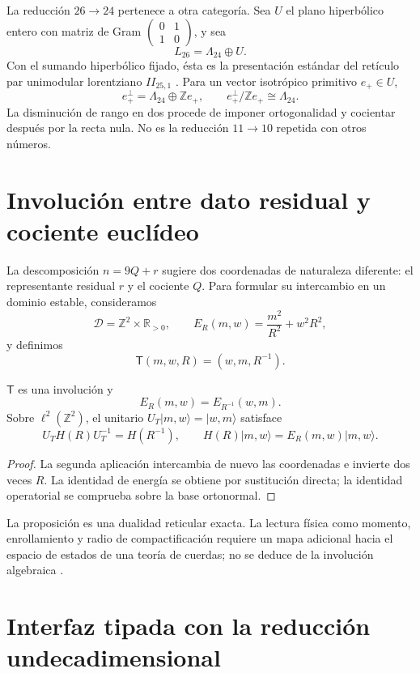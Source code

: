 La reducción \(26\to24\) pertenece a otra categoría. Sea \(U\) el plano
hiperbólico entero con matriz de Gram
\(\left(\begin{smallmatrix}0&1\\1&0\end{smallmatrix}\right)\), y sea
\[
 L_{26}=\Lambda_{24}\oplus U.
\]
Con el sumando hiperbólico fijado, ésta es la presentación estándar del
retículo par unimodular lorentziano \(II_{25,1}\)
\cite{ConwaySloane1999}.
Para un vector isotrópico primitivo \(e_+\in U\),
\[
 e_+^\perp=\Lambda_{24}\oplus\mathbb Ze_+,
\qquad
 e_+^\perp/\mathbb Ze_+\cong\Lambda_{24}.
\]
La disminución de rango en dos procede de imponer ortogonalidad y cocientar
después por la recta nula. No es la reducción \(11\to10\) repetida con otros
números.

\section{Involución entre dato residual y cociente euclídeo}

La descomposición \(n=9Q+r\) sugiere dos coordenadas de naturaleza diferente:
el representante residual \(r\) y el cociente \(Q\). Para formular su
intercambio en un dominio estable, consideramos
\[
 \mathcal D=\mathbb Z^2\times\mathbb R_{>0},
\qquad
 E_R(m,w)=\frac{m^2}{R^2}+w^2R^2,
\]
y definimos
\[
 \mathsf T(m,w,R)=(w,m,R^{-1}).
\]
\begin{proposition}
\(\mathsf T\) es una involución y
\[
 E_R(m,w)=E_{R^{-1}}(w,m).
\]
Sobre \(\ell^2(\mathbb Z^2)\), el unitario
\(U_T|m,w\rangle=|w,m\rangle\) satisface
\[
 U_TH(R)U_T^{-1}=H(R^{-1}),
\qquad
 H(R)|m,w\rangle=E_R(m,w)|m,w\rangle.
\]
\end{proposition}
\begin{proof}
La segunda aplicación intercambia de nuevo las coordenadas e invierte dos
veces \(R\). La identidad de energía se obtiene por sustitución directa; la
identidad operatorial se comprueba sobre la base ortonormal.
\end{proof}

La proposición es una dualidad reticular exacta. La lectura física como
momento, enrollamiento y radio de compactificación requiere un mapa adicional
hacia el espacio de estados de una teoría de cuerdas; no se deduce de la
involución algebraica \cite{Giveon1994}.

\section{Interfaz tipada con la reducción undecadimensional}

